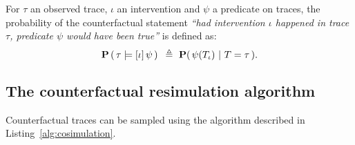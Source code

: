 \begin{definition} 
  For $\tau$ an observed trace, $\iota$ an intervention and $\psi$ a
  predicate on traces, the probability of the counterfactual statement
  \textit{``had intervention $\iota$ happened in trace $\tau$,
    predicate $\psi$ would have been true''} is defined as:
  \[ \mathbf{P}\left( \,\tau \models [\iota] \, \psi \,\right){} \ \triangleq \
    \mathbf{P}(\, \psi({T_\iota}{}) \ |\ T = \tau\,). \]
\end{definition}

\subsection{The counterfactual resimulation algorithm}

Counterfactual traces can be sampled using the algorithm described in
Listing~\ref{alg:cosimulation}.


